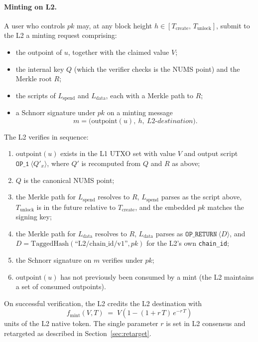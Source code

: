 \documentclass[11pt,a4paper]{article}
\newcommand{\fmint}{f_{\mathrm{mint}}}
\begin{document}
\paragraph{Minting on L2.} A user who controls $pk$ may, at any block height $h \in [T_{\mathrm{create}},\, T_{\mathrm{unlock}}]$, submit to the L2 a minting request comprising:

\begin{itemize}[leftmargin=*]
  \item the outpoint of $u$, together with the claimed value $V$;
  \item the internal key $Q$ (which the verifier checks is the NUMS point) and the Merkle root $R$;
  \item the scripts of $L_{\mathrm{spend}}$ and $L_{\mathrm{data}}$, each with a Merkle path to $R$;
  \item a Schnorr signature under $pk$ on a minting message
  \[
  m = \big(\mathrm{outpoint}(u),\ h,\ \mathit{L2\text{-}destination}\big).
  \]
\end{itemize}

The L2 verifies in sequence:
\begin{enumerate}[leftmargin=*,label=(\roman*)]
  \item $\mathrm{outpoint}(u)$ exists in the L1 UTXO set with value $V$ and output script $\texttt{OP\_1}\ \langle Q'_x\rangle$, where $Q'$ is recomputed from $Q$ and $R$ as above;
  \item $Q$ is the canonical NUMS point;
  \item the Merkle path for $L_{\mathrm{spend}}$ resolves to $R$, $L_{\mathrm{spend}}$ parses as the script above, $T_{\mathrm{unlock}}$ is in the future relative to $T_{\mathrm{create}}$, and the embedded $pk$ matches the signing key;
  \item the Merkle path for $L_{\mathrm{data}}$ resolves to $R$, $L_{\mathrm{data}}$ parses as $\texttt{OP\_RETURN}\ \langle D\rangle$, and $D = \mathrm{TaggedHash}(\text{``L2/chain\_id/v1''}, pk)$ for the L2's own \texttt{chain\_id};
  \item the Schnorr signature on $m$ verifies under $pk$;
  \item $\mathrm{outpoint}(u)$ has not previously been consumed by a mint (the L2 maintains a set of consumed outpoints).
\end{enumerate}

On successful verification, the L2 credits the L2 destination with
\begin{equation}
\label{eq:mintfn}
\fmint(V, T) \;=\; V\!\left(1 - (1 + r\,T)\,e^{-r\,T}\right)
\end{equation}
units of the L2 native token. The single parameter $r$ is set in L2 consensus and retargeted as described in Section~\ref{sec:retarget}.
\end{document}
